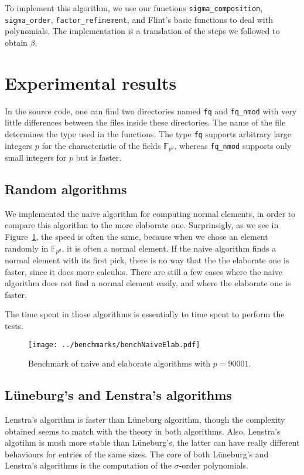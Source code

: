 \documentclass[a4paper,11pt]{article}
\theoremstyle{break}
\theoremstyle{sc}
\theoremstyle{definition}
\theoremstyle{remark}
\begin{document}
To implement this algorithm, we use our functions
\texttt{sigma\_composition},
\texttt{sigma\_order}, \texttt{factor\_refinement}, and Flint's basic functions to deal with
polynomials. The implementation is a translation of the steps we followed
to obtain $\beta$.

\section{Experimental results}
In the source code, one can find two directories named \texttt{fq} and
\texttt{fq\_nmod} with very little differences between the files inside these
directories. The name of the file determines the type used in the functions. The
type \texttt{fq} supports arbitrary large integers $p$ for the characteristic of
the fields $\mathbb{F}_{p^d}$, whereas \texttt{fq\_nmod} supports only small
integers for $p$ but is faster.

\subsection{Random algorithms}
We implemented the naive algorithm for computing normal elements, in order to
compare this algorithm to the more elaborate one. Surprinsigly, as we see in
Figure~\ref{NaiveElab}, the speed is
often the same, because when we chose an element randomly in
$\mathbb{F}_{p^d}$, it is often a normal element. If the naive algorithm finds a
normal element with its first pick, there is no way that the the elaborate one is
faster, since it does more calculus. There are still a few cases where the naive
algorithm does not find a normal element easily, and where the elaborate one is
faster.

The time spent in those algorithms is essentially to time spent to perform the
tests. 

\begin{figure}
  \begin{center}
\texttt{[image: ../benchmarks/benchNaiveElab.pdf]}
\end{center}
\caption{Benchmark of naive and elaborate algorithms with $p=90001$.}
\label{NaiveElab}
\end{figure}

\subsection{Lüneburg's and Lenstra's algorithms}

Lenstra's algorithm is faster than Lüneburg algorithm, though the complexity
obtained seems to match with the theory in both algorithms. Also, Lenstra's
algotihm is mush more stable than Lüneburg's, the latter can have really
different behaviours for entries of the same sizes. The core of
both Lüneburg's and Lenstra's algorithms is the computation of the
$\sigma$-order polynomials.
\end{document}
